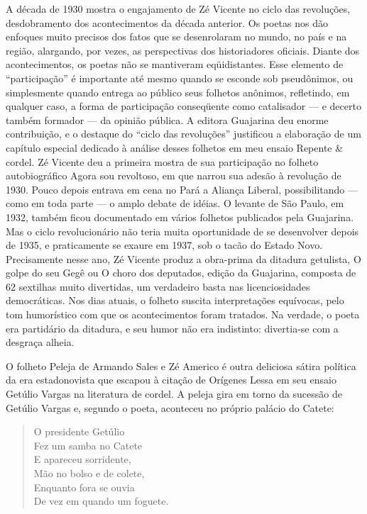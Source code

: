 A década de 1930 mostra o engajamento de Zé Vicente no ciclo das
revoluções, desdobramento dos acontecimentos da década anterior. Os
poetas nos dão enfoques muito precisos dos fatos que se desenrolaram
no mundo, no país e na região, alargando, por vezes, as perspectivas
dos historiadores oficiais. Diante dos acontecimentos, os poetas não
se mantiveram eqüidistantes. Esse elemento de “participação” é
importante até mesmo quando se esconde sob pseudônimos, ou
simplesmente quando entrega ao público seus folhetos anônimos,
refletindo, em qualquer caso, a forma de participação conseqüente
como catalisador — e decerto também formador — da opinião pública. A
editora Guajarina deu enorme contribuição, e o destaque do “ciclo das
revoluções” justificou a elaboração de um capítulo especial dedicado
à análise desses folhetos em meu ensaio Repente \& cordel. 
\pagebreak
Zé Vicente deu a primeira mostra de sua participação no folheto
autobiográfico Agora sou revoltoso, em que narrou sua adesão à
revolução de 1930. Pouco depois entrava em cena no Pará a Aliança
Liberal, possibilitando — como em toda parte — o amplo debate de
idéias. O levante de São Paulo, em 1932, também ficou documentado em
vários folhetos publicados pela Guajarina. Mas o ciclo revolucionário
não teria muita oportunidade de se desenvolver depois de 1935, e
praticamente se exaure em 1937, sob o tacão do Estado Novo.
Precisamente nesse ano, Zé Vicente produz a obra-prima da ditadura
getulista, O golpe do seu Gegê ou O choro dos deputados, edição da
Guajarina, composta de 62 sextilhas muito divertidas, um verdadeiro
basta nas licenciosidades democráticas. Nos dias atuais, o folheto
suscita interpretações equívocas, pelo tom humorístico com que os
acontecimentos foram tratados. Na verdade, o poeta era partidário da
ditadura, e seu humor não era indistinto: divertia-se com a desgraça
alheia.

O folheto Peleja de Armando Sales e Zé Americo é outra deliciosa
sátira política da era estadonovista que escapou à citação de
Orígenes Lessa em seu ensaio Getúlio Vargas na literatura de cordel.
A peleja gira em torno da sucessão de Getúlio Vargas e, segundo o
poeta, aconteceu no próprio palácio do Catete: 

\begin{verse}
O presidente Getúlio\\
Fez um samba no Catete\\
E apareceu sorridente,\\
Mão no bolso e de colete,\\
Enquanto fora se ouvia\\
De vez em quando um foguete.
\end{verse}

